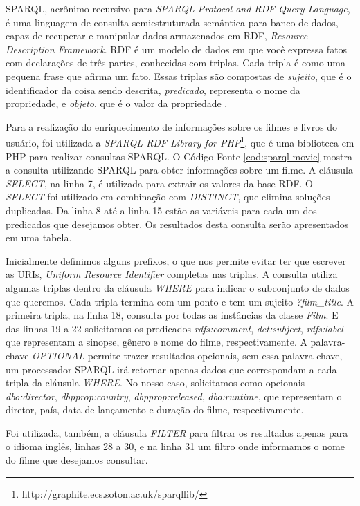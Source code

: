SPARQL, acrônimo recursivo para \textit{SPARQL Protocol and
RDF Query Language}, é uma linguagem de consulta semiestruturada semântica para banco de dados, capaz de recuperar e manipular dados armazenados em RDF, \textit{Resource Description Framework}. RDF é um modelo de dados em que você expressa fatos com declarações de três partes, conhecidas com triplas. Cada tripla é como uma pequena frase que afirma um fato. Essas triplas são compostas de \textit{sujeito}, que é o identificador da coisa sendo descrita, \textit{predicado}, representa o nome da propriedade, e \textit{objeto}, que é o valor da propriedade \citep{ducharme2011sparql}.

Para a realização do enriquecimento de informações sobre os filmes e livros do usuário, foi utilizada a \textit{SPARQL RDF Library for PHP}\footnote{http://graphite.ecs.soton.ac.uk/sparqllib/}, que é uma biblioteca em PHP para realizar consultas SPARQL. O Código Fonte \ref{cod:sparql-movie} mostra a consulta utilizando SPARQL para obter informações sobre um filme. A cláusula \textit{SELECT}, na linha 7, é utilizada para extrair os valores da base RDF. O \textit{SELECT} foi utilizado em combinação com \textit{DISTINCT}, que elimina soluções duplicadas. Da linha 8 até a linha 15 estão as variáveis para cada um dos predicados que desejamos obter. Os resultados desta consulta serão apresentados em uma tabela.

Inicialmente definimos alguns prefixos, o que nos permite evitar ter que escrever as URIs, \textit{Uniform Resource Identifier} completas nas triplas. A consulta utiliza algumas triplas dentro da cláusula \textit{WHERE} para indicar o subconjunto de dados que queremos. Cada tripla termina com um ponto e tem um sujeito \textit{?film\_title}. A primeira tripla, na linha 18, consulta por todas as instâncias da classe \textit{Film}. E das linhas 19 a 22 solicitamos os predicados \textit{rdfs:comment}, \textit{dct:subject}, \textit{rdfs:label} que representam a sinopse, gênero e nome do filme, respectivamente. A palavra-chave \textit{OPTIONAL} permite trazer resultados opcionais, sem essa palavra-chave, um processador SPARQL irá retornar apenas dados que correspondam a cada tripla da cláusula \textit{WHERE}. No nosso caso, solicitamos como opcionais \textit{dbo:director}, \textit{dbpprop:country}, \textit{dbpprop:released}, \textit{dbo:runtime}, que representam o diretor, país, data de lançamento e duração do filme, respectivamente.

Foi utilizada, também, a cláusula \textit{FILTER} para filtrar os resultados apenas para o idioma inglês, linhas 28 a 30, e na linha 31 um filtro onde informamos o nome do filme que desejamos consultar.

